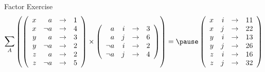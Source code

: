 \documentclass[14pt]{beamer}
\begin{document}
\begin{frame}{Factor Exercise}
\small\setlength{\arraycolsep}{0.2em}
\[
\mathlarger{\sum}_{A}
\left(
\left(\begin{array}{ r r c l }
x & a & \rightarrow & 1 \\
x & \lnot a & \rightarrow & 4 \\
y & a & \rightarrow & 3 \\
y & \lnot a & \rightarrow & 2 \\
z & a & \rightarrow & 2 \\
z & \lnot a & \rightarrow & 5
\end{array}\right)
\times
\left(\begin{array}{ r r c l }
a & i & \rightarrow & 3 \\
a & j & \rightarrow & 6 \\
\lnot a & i & \rightarrow & 2 \\
\lnot a & j & \rightarrow & 4
\end{array}\right)
\right)
=
\pause
\left(\begin{array}{ r r c l }
x & i & \rightarrow & 11 \\
x & j & \rightarrow & 22 \\
y & i & \rightarrow & 13 \\
y & j & \rightarrow & 26 \\
z & i & \rightarrow & 16 \\
z & j & \rightarrow & 32
\end{array}\right)
\]
\end{frame}
\end{document}
